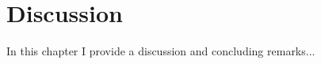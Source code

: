 \chapter{Discussion}
\label{Discussion}

In this chapter I provide a discussion and concluding remarks...
